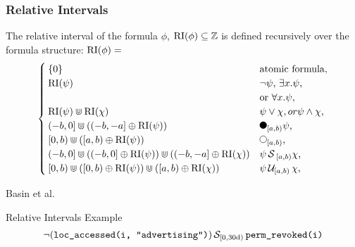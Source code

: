 \begin{frame}
    \frametitle{Relative Intervals}
    \begin{definition} 
        \label{def:rel-int}
        The relative interval of the formula $\phi$, $\operatorname{RI}(\phi) \subseteq \mathbb{Z}$ is defined recursively over the formula structure: 
        $\operatorname{RI}(\phi) =$
        \begin{equation*}
            \begin{cases}
                \{0\}     & \text{atomic formula,} \\ 
                \RI(\psi) & \text{$\neg \psi$, 
                                    $\exists x.\psi$,} \\ &\text{or $\forall x.\psi$,} \\
                \RI(\psi) \Cup \RI(\chi) & \text{$\psi \lor \chi, or
                                                \psi \land \chi$,} \\
                (-b,0] \Cup ((-b,-a] \oplus \RI(\psi)) & \text{$\Previous{[a,b)}\psi$,} \\
                [0,b) \Cup ([a,b) \oplus \RI(\psi)) & \text{$\Next{[a,b)}$,}\\
                (-b,0] \Cup ((-b,0] \oplus \RI(\psi)) \Cup ((-b,-a] \oplus \RI(\chi)) & \text{$\psi \Since{}_{[a,b)} \chi$,} \\
                [0,b) \Cup ([0,b) \oplus \RI(\psi)) \Cup ([a,b) \oplus \RI(\chi)) & \text{$\psi \Until{[a,b)} \chi$,} \\
            \end{cases}
        \end{equation*}
    \end{definition}
    Basin et al. \cite{Basin2016}
\end{frame}

\begin{frame}{Relative Intervals Example}
    \begin{align*}
        \neg (\texttt{loc\_accessed(i, "advertising")}) 
        \,\mathcal{S}_{[0,30\text{d})}\,
        \texttt{perm\_revoked(i)}
    \end{align*}
    
\end{frame}

